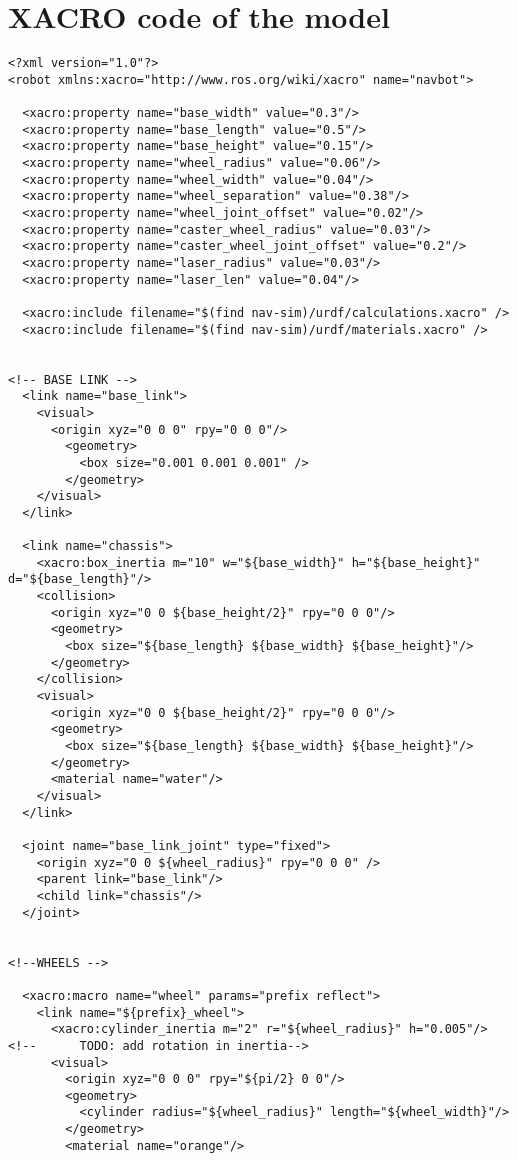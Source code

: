 \section{XACRO code of the model}
\begin{verbatim}
<?xml version="1.0"?>
<robot xmlns:xacro="http://www.ros.org/wiki/xacro" name="navbot">

  <xacro:property name="base_width" value="0.3"/>
  <xacro:property name="base_length" value="0.5"/>
  <xacro:property name="base_height" value="0.15"/>
  <xacro:property name="wheel_radius" value="0.06"/>
  <xacro:property name="wheel_width" value="0.04"/>
  <xacro:property name="wheel_separation" value="0.38"/>
  <xacro:property name="wheel_joint_offset" value="0.02"/>
  <xacro:property name="caster_wheel_radius" value="0.03"/>
  <xacro:property name="caster_wheel_joint_offset" value="0.2"/>
  <xacro:property name="laser_radius" value="0.03"/>
  <xacro:property name="laser_len" value="0.04"/>

  <xacro:include filename="$(find nav-sim)/urdf/calculations.xacro" />
  <xacro:include filename="$(find nav-sim)/urdf/materials.xacro" />


<!-- BASE LINK -->
  <link name="base_link">
    <visual>
      <origin xyz="0 0 0" rpy="0 0 0"/>
        <geometry>
          <box size="0.001 0.001 0.001" />
        </geometry>
    </visual>
  </link>

  <link name="chassis">
    <xacro:box_inertia m="10" w="${base_width}" h="${base_height}" d="${base_length}"/>
    <collision>
      <origin xyz="0 0 ${base_height/2}" rpy="0 0 0"/>
      <geometry>
        <box size="${base_length} ${base_width} ${base_height}"/>
      </geometry>
    </collision>
    <visual>
      <origin xyz="0 0 ${base_height/2}" rpy="0 0 0"/>
      <geometry>
        <box size="${base_length} ${base_width} ${base_height}"/>
      </geometry>
      <material name="water"/>
    </visual>
  </link>

  <joint name="base_link_joint" type="fixed">
    <origin xyz="0 0 ${wheel_radius}" rpy="0 0 0" />
    <parent link="base_link"/>
    <child link="chassis"/>
  </joint>


<!--WHEELS -->

  <xacro:macro name="wheel" params="prefix reflect">
    <link name="${prefix}_wheel">
      <xacro:cylinder_inertia m="2" r="${wheel_radius}" h="0.005"/>
<!--      TODO: add rotation in inertia-->
      <visual>
        <origin xyz="0 0 0" rpy="${pi/2} 0 0"/>
        <geometry>
          <cylinder radius="${wheel_radius}" length="${wheel_width}"/>
        </geometry>
        <material name="orange"/>


\end{verbatim}
